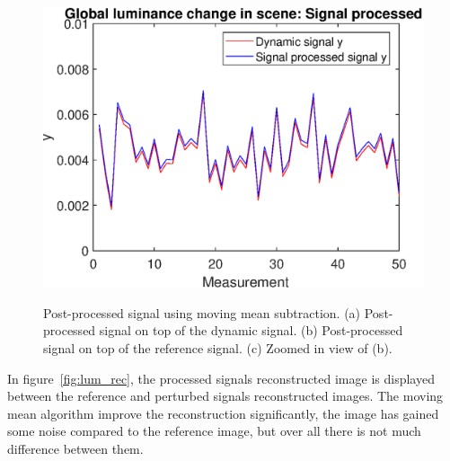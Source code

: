 \begin{figure}[H]
\begin{minipage}[t]{0.50\textwidth}
    \includegraphics[width = \textwidth]{result/dynamic/lum/intense_change_sp_ref_win.eps}
    \subcaption{}
    \label{fig:lum_sig_4}
\end{minipage}
    \caption{Post-processed signal using moving mean subtraction. (a) Post-processed signal on top of the dynamic signal. (b) Post-processed signal on top of the reference signal. (c) Zoomed in view of (b).}
    \label{fig:lum_sig}
\end{figure}

In figure~\ref{fig:lum_rec}, the processed signals reconstructed image is displayed between the reference and perturbed signals reconstructed images. The moving mean algorithm improve the reconstruction significantly, the image has gained some noise compared to the reference image, but over all there is not much difference between them.


